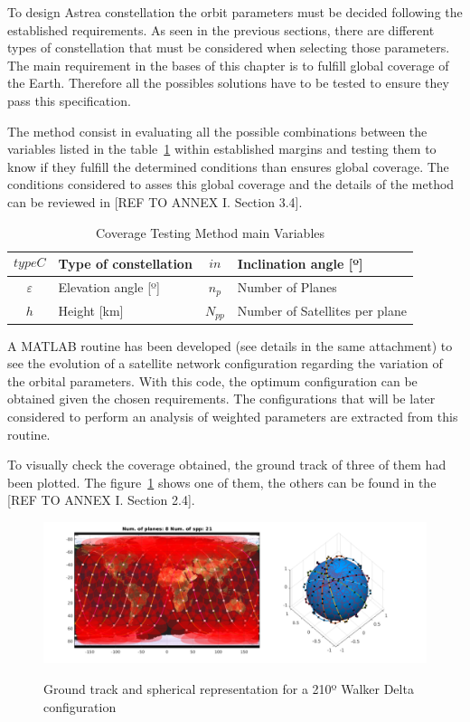 
To design Astrea constellation the orbit parameters must be decided following the established requirements. As seen in the previous sections, there are different types of constellation that must be considered when selecting those parameters. The main requirement in the bases of this chapter is to fulfill global coverage of the Earth. Therefore all the possibles solutions have to be tested to ensure they pass this specification.

The method consist in evaluating all the possible combinations between the variables listed in the table~\ref{t:CovVar} within established margins and  testing them to know if they fulfill the determined conditions than ensures global coverage. The conditions considered to asses this global coverage and the details of the method can be reviewed in [REF TO ANNEX I. Section 3.4]. %

\begin{table}[H]
\centering
\begin{tabular}{|c|l|c|l|}
\hline
$$typeC$$     & Type of constellation    & $$in$$  & Inclination angle {[}º{]} \\ \hline
$\varepsilon$ & Elevation angle {[}º{]}  & $n_{p}$ & Number of Planes                          \\ \hline
$$h$$         & Height  {[}km{]}  & $N_{pp}$ & Number of Satellites per plane            \\ \hline
\end{tabular}
\caption{Coverage Testing Method main Variables}
\label{t:CovVar}
\end{table}  

A MATLAB routine has been developed (see details in the same attachment) to see the evolution of a satellite network configuration regarding the variation of the orbital parameters. With this code, the optimum configuration can be obtained given the chosen requirements. The configurations that will be later considered to perform an analysis of weighted parameters are extracted from this routine.

To visually check the coverage obtained, the ground track of three of them had been plotted. The figure~\ref{fig:gt210} shows one of them, the others can be found in the [REF TO ANNEX I. Section 2.4]. 

\begin{figure}[H] %
	\centering
	\includegraphics[width=.8\textwidth]{./testing/WB210.png}\\
	\caption{Ground track and spherical representation for a 210º Walker Delta configuration}
	\label{fig:gt210}
\end{figure}